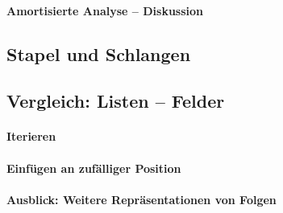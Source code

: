 \paragraph{Amortisierte Analyse – Diskussion}
\subsection{Stapel und Schlangen}
\subsection{Vergleich: Listen – Felder}
\paragraph{Iterieren}
\paragraph{Einfügen an zufälliger Position}
\paragraph*{Ausblick: Weitere Repräsentationen von Folgen}


